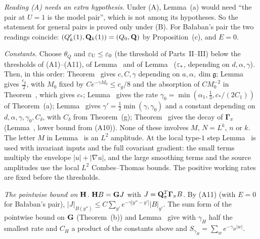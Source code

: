 \begin{detail}
\begin{step}
\end{step}
\begin{step}
\emph{Reading (A) needs an extra hypothesis.} Under (A), Lemma~(a) would need ``the pair at $U=1$ is the model pair'', which is not among its hypotheses. So the statement for general pairs is proved only under (B). For Ba\l aban's pair the two readings coincide: $(Q'_k(1),\mathbf Q_k(1))=(Q_0,\mathbf Q)$ by Proposition~(c), and $E=0$.
\end{step}
\end{detail}

\begin{detail}\label{d7:step34}
\begin{step}
\emph{Constants.} Choose $\theta_Q$ and $\varepsilon_{\rm U}\le\varepsilon_0$ (the threshold of Parts~II--III) below the thresholds of (A1)--(A11), of Lemma~ and of Lemma~ ($\varepsilon_*$, depending on $d,\alpha,\gamma$). Then, in this order: Theorem~ gives $c,C,\gamma$ depending on $a,\alpha,\dim\mathfrak g$; Lemma~ gives $\frac{c_g}2$, with $M_0$ fixed by $Ce^{-\gamma M_0}\le c_g/8$ and the absorption of $CM_0^{-2}$ in Theorem~, which gives $c_*$; Lemma~ gives the rate $\gamma_0=\min(\alpha_1,\frac13,c_*/(2C_1))$ of Theorem~(a); Lemma~ gives $\gamma'=\frac12\min(\gamma,\gamma_0)$ and a constant depending on $d,\alpha,\gamma,\gamma_0,C_\delta$, with $C_\delta$ from Theorem~(g); Theorem~ gives the decay of $\boldsymbol\Gamma_\pi$ (Lemma~, lower bound from (A10)). None of these involves $M$, $N=L^k$, $n$ or $k$. The letter $M$ in Lemma~ is an $L^2$ amplitude. At the local type-$1$ step Lemma~ is used with invariant inputs and the full covariant gradient: the small terms multiply the envelope $|u|+|\nabla u|$, and the large smoothing terms and the source amplitudes use the local $L^2$ Combes--Thomas bounds. The positive working rates are fixed before the thresholds.
\end{step}
\begin{step}
\emph{The pointwise bound on $\mathbf H$.} $\mathbf H B=\mathbf G J$ with $J=\mathbf Q_\pi^T\boldsymbol\Gamma_\pi B$. By (A11) (with $E=0$ for Ba\l aban's pair), $|J|_{B(y'')}\le C\sum_{y'}e^{-\gamma|y''-y'|}|B|_{y'}$. The sum form of the pointwise bound on $\mathbf G$ (Theorem~(b)) and Lemma~ give  with $\gamma_H$ half the smallest rate and $C_H$ a product of the constants above and $S_{\gamma_H}=\sum_{w}e^{-\gamma_H|w|}$.

\end{step}
\end{detail}
